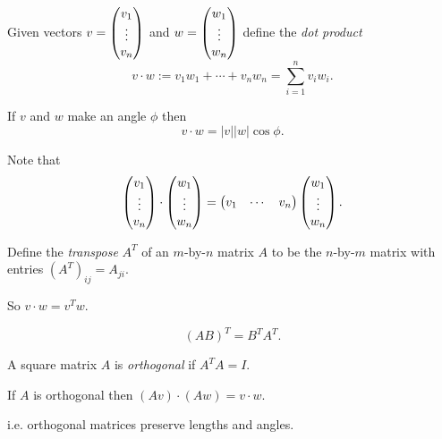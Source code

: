 \documentclass{beamer}
\begin{document}
\begin{frame}
\begin{Definition}
Given vectors \(v=\begin{pmatrix} v_1 \\ \vdots \\ v_n\end{pmatrix}\) and \(w=\begin{pmatrix} w_1
\\ \vdots \\ w_n\end{pmatrix}\) define the {\em dot product} \[v\cdot
w:=v_1w_1+\cdots+v_nw_n=\sum_{i=1}^nv_iw_i.\]


\end{Definition}
\begin{Theorem}\label{thm:angle}
If \(v\) and \(w\) make an angle \(\phi\) then
\[v\cdot w=|v||w|\cos\phi.\]


\end{Theorem}
\end{frame}
\begin{frame}
Note that \[\begin{pmatrix} v_1\\ \vdots\\v_n\end{pmatrix}\cdot\begin{pmatrix}
w_1\\\vdots\\ w_n\end{pmatrix}=\begin{pmatrix} v_1 & \cdots & v_n\end{pmatrix}\begin{pmatrix}
w_1\\\vdots\\ w_n\end{pmatrix}.\]


\begin{Definition}
Define the {\em transpose} \(A^T\) of an \(m\)-by-\(n\) matrix
\(A\) to be the \(n\)-by-\(m\) matrix with entries
\((A^T)_{ij}=A_{ji}\).


\end{Definition}
So \(v\cdot w=v^Tw\).


\end{frame}
\begin{frame}
\begin{Lemma}
\[(AB)^T=B^TA^T.\]


\end{Lemma}
\begin{Definition}\label{dfn:orthomat}
A square matrix \(A\) is {\em orthogonal} if \(A^TA=I\).


\end{Definition}
\begin{Lemma}
If \(A\) is orthogonal then \((Av)\cdot(Aw)=v\cdot w\).
\vspace{0.4cm}


 i.e. orthogonal matrices preserve lengths and angles.


\end{Lemma}
\end{frame}
\end{document}
